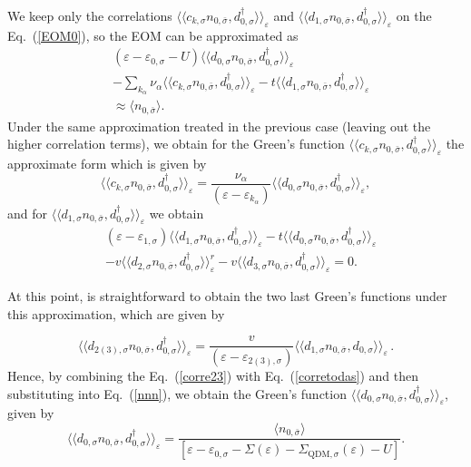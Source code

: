 \documentclass[aps,twocolumn,prb,superscript,floatfix,superscriptaddress,showpacs]{revtex4-1}
\newcommand{\ve}{\varepsilon}
\newcommand{\la}{\langle}
\newcommand{\ra}{\rangle}
\begin{document}
We keep only the correlations $\la\la c_{k,\sigma}n_{0,\bar{\sigma}}, d_{0, \sigma}^{\dagger}\ra\ra_{\ve}$ and $\la\la d_{1,\sigma}n_{0,\bar{\sigma}},d_{0,\sigma}^{\dagger} \ra\ra_{\ve}$ on the Eq.\ (\ref{EOM0}), so the EOM can be approximated as
\begin{eqnarray}
\nonumber
&\left(\ve-\ve_{0,\sigma}-U\right)\la\la d_{0,\sigma}n_{0,\bar{\sigma}},d_{0,\sigma}^{\dagger}\ra\ra_{\ve} \\ \nonumber &-\sum_{k_{\alpha}}\nu_{\alpha} \la\la c_{k,\sigma}n_{0,\bar{\sigma}}, d_{0, \sigma}^{\dagger}\ra\ra_{\ve}-t\la\la d_{1,\sigma}n_{0,\bar{\sigma}},d_{0,\sigma}^{\dagger} \ra\ra_{\ve} \\ &\approx \langle n_{0,\bar{\sigma}}\rangle.
\label{nnn}
\end{eqnarray}
Under the same approximation treated in the previous case (leaving out the higher correlation terms), we obtain for the Green's function $\la\la c_{k,\sigma}n_{0,\bar{\sigma}}, d_{0, \sigma}^{\dagger}\ra\ra_{\ve}$ the approximate form which is given by
\begin{equation}
\la\la c_{k,\sigma}n_{0,\bar{\sigma}}, d_{0, \sigma}^{\dagger}\ra\ra_{\ve}=\frac{\nu_{\alpha}}{\left(\ve-\ve_{k_{\alpha}}\right)}\la\la d_{0,\sigma}n_{0,\bar{\sigma}},d_{0,\sigma}^{\dagger}\ra\ra_{\ve},
\end{equation}
and for $\la\la d_{1,\sigma}n_{0,\bar{\sigma}},d_{0,\sigma}^{\dagger} \ra\ra_{\ve}$ we obtain
\begin{equation}
\begin{aligned}
& \left(\ve-\ve_{1,\sigma}\right)\la\la d_{1,\sigma}n_{0,\bar{\sigma}},d_{0,\sigma}^{\dagger} \ra\ra_{\ve}-t\la\la d_{0,\sigma}n_{0,\bar{\sigma}},d_{0,\sigma}^{\dagger}\ra\ra_{\ve} \\ &-v\la\la d_{2,\sigma}n_{0,\bar{\sigma}},d_{0,\sigma}^{\dagger}\ra\ra^{r}_{\ve}-v \la\la d_{3,\sigma}n_{0,\bar{\sigma}},d_{0,\sigma}^{\dagger}\ra\ra_{\ve}=0.
\end{aligned}\label{corretodas}
\end{equation}

At this point, is straightforward to obtain the two last Green's functions under this approximation, which are given by

\begin{equation}
\la\la d_{2(3),\sigma}n_{0,\bar{\sigma}},d_{0,\sigma}^{\dagger}\ra\ra_{\ve}=\frac{v}{\left(\ve-\ve_{2(3),\sigma}\right)} \la\la d_{1,\sigma} n_{0,\bar{\sigma}},d_{0,\sigma}\ra\ra_{\ve}\,.\label{corre23}
\end{equation}
Hence, by combining the Eq.\ (\ref{corre23}) with Eq.\ (\ref{corretodas}) and then substituting into Eq.\ (\ref{nnn}), we obtain the Green's function $\la\la d_{0,\sigma}n_{0,\bar{\sigma}},d_{0,\sigma}^{\dagger}\ra\ra_{\ve}$, given by
\begin{equation}
\la\la d_{0,\sigma}n_{0,\bar{\sigma}},d_{0,\sigma}^{\dagger}\ra\ra_{\ve}=\frac{\langle n_{0,\bar{\sigma}}\rangle}{\left[ \ve-\ve_{0,\sigma}-\Sigma\left(\ve\right)-\Sigma_{\text{QDM},\sigma}\left(\ve\right)-U\right]}.
\label{A17}
\end{equation}
\end{document}
